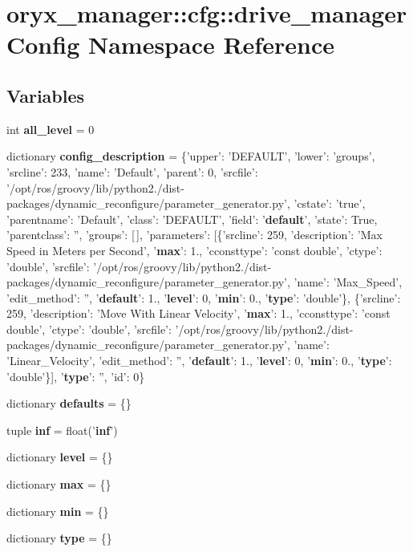 \section{oryx\-\_\-manager\-:\-:cfg\-:\-:drive\-\_\-manager\-Config \-Namespace \-Reference}
\label{namespaceoryx__manager_1_1cfg_1_1drive__managerConfig}
\subsection*{\-Variables}
\begin{DoxyCompactItemize}
\item 
int {\bf all\-\_\-level} = 0
\item 
dictionary {\bf config\-\_\-description} = \{'upper'\-: '\-D\-E\-F\-A\-U\-L\-T', 'lower'\-: 'groups', 'srcline'\-: 233, 'name'\-: '\-Default', 'parent'\-: 0, 'srcfile'\-: '/opt/ros/groovy/lib/python2./dist-\/packages/dynamic\-\_\-reconfigure/parameter\-\_\-generator.\-py', 'cstate'\-: 'true', 'parentname'\-: '\-Default', 'class'\-: '\-D\-E\-F\-A\-U\-L\-T', 'field'\-: '{\bf default}', 'state'\-: \-True, 'parentclass'\-: '', 'groups'\-: [$\,$], 'parameters'\-: [\{'srcline'\-: 259, 'description'\-: '\-Max \-Speed in \-Meters per \-Second', '{\bf max}'\-: 1., 'cconsttype'\-: 'const double', 'ctype'\-: 'double', 'srcfile'\-: '/opt/ros/groovy/lib/python2./dist-\/packages/dynamic\-\_\-reconfigure/parameter\-\_\-generator.\-py', 'name'\-: '\-Max\-\_\-\-Speed', 'edit\-\_\-method'\-: '', '{\bf default}'\-: 1., '{\bf level}'\-: 0, '{\bf min}'\-: 0., '{\bf type}'\-: 'double'\}, \{'srcline'\-: 259, 'description'\-: '\-Move \-With \-Linear \-Velocity', '{\bf max}'\-: 1., 'cconsttype'\-: 'const double', 'ctype'\-: 'double', 'srcfile'\-: '/opt/ros/groovy/lib/python2./dist-\/packages/dynamic\-\_\-reconfigure/parameter\-\_\-generator.\-py', 'name'\-: '\-Linear\-\_\-\-Velocity', 'edit\-\_\-method'\-: '', '{\bf default}'\-: 1., '{\bf level}'\-: 0, '{\bf min}'\-: 0., '{\bf type}'\-: 'double'\}], '{\bf type}'\-: '', 'id'\-: 0\}
\item 
dictionary {\bf defaults} = \{\}
\item 
tuple {\bf inf} = float('{\bf inf}')
\item 
dictionary {\bf level} = \{\}
\item 
dictionary {\bf max} = \{\}
\item 
dictionary {\bf min} = \{\}
\item 
dictionary {\bf type} = \{\}
\end{DoxyCompactItemize}


